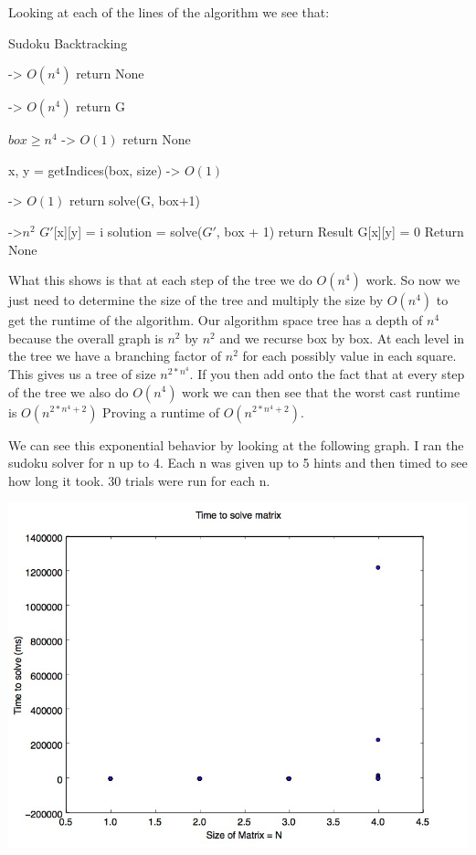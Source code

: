 \documentclass{sig-alternate}
\begin{document}
Looking at each of the lines of the algorithm we see that:

\begin{algorithm}
\caption{Sudoku Backtracking}\label{solve}
\begin{algorithmic}[1]

 -> $O(n^4)$
\State return None
\EndIf

 -> $O(n^4)$
\State return G
\EndIf

\If $box \ge n^4$ -> $O(1)$
\State return None
\EndIf

\State x, y = getIndices(box, size) -> $O(1)$

 -> $O(1)$
\State return solve(G, box+1)
\EndIf

 ->$n^2$
\State $G'$[x][y] = i
\State solution = solve($G'$, box + 1) 
\State return Result
\EndIf
\EndFor
\State G[x][y] = 0
\State Return None
\EndProcedure
\end{algorithmic}
\end{algorithm}

What this shows is that at each step of the tree we do $O(n^4)$ work. So now we just need to determine the size of the tree and multiply the size by $O(n^4)$ to get the runtime of the algorithm. Our algorithm space tree has a depth of $n^4$ because the overall graph is $n^2$ by $n^2$ and we recurse box by box. At each level in the tree we have a branching factor of $n^2$ for each possibly value in each square. This gives us a tree of size $n^{2*n^4}$. If you then add onto the fact that at every step of the tree we also do $O(n^4)$ work we can then see that the worst cast runtime is $O(n^{2*n^4 + 2})$ Proving a runtime of $O(n^{2*n^4 + 2})$. 

We can see this exponential behavior by looking at the following graph. I ran the sudoku solver for n up to 4. Each n was given up to 5 hints and then timed to see how long it took. 30 trials were run for each n. 

\includegraphics[width=\linewidth]{src/allN.jpg}
\end{document}
